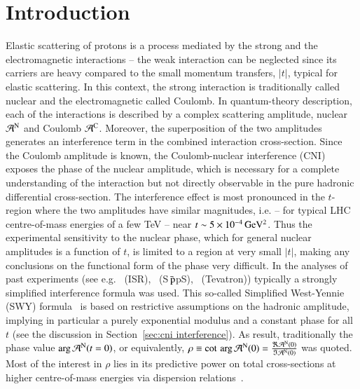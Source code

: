 \section{Introduction}
\label{sec:introduction}

Elastic scattering of protons is a process mediated by the strong and the electromagnetic interactions -- the weak interaction can be neglected since its carriers are heavy compared to the small momentum transfers, $|t|$, typical for elastic scattering. In this context, the strong interaction is traditionally called nuclear and the electromagnetic called Coulomb. In quantum-theory description, each of the interactions is described by a complex scattering amplitude, nuclear ${\cal A}^{\rm N}$ and Coulomb ${\cal A}^{\rm C}$. Moreover, the superposition 
of the two amplitudes generates an interference term in the combined interaction cross-section. 
Since the Coulomb amplitude is known, the Coulomb-nuclear interference (CNI) exposes the phase of the nuclear amplitude, which is necessary for a complete understanding of the interaction but not directly observable in the pure hadronic differential cross-section. The interference effect is most pronounced in the $t$-region where the two amplitudes have similar magnitudes, i.e. -- for typical LHC centre-of-mass energies of a few TeV -- near $t \sim 5 \times 10^{-4}\,\rm GeV^{2}$. Thus the experimental sensitivity to 
the nuclear phase, which for general nuclear amplitudes is a function of $t$, 
is limited to a region at very small $|t|$, making any conclusions on the 
functional form of the phase very difficult.
In the analyses of past experiments (see e.g.~\cite{plb43,plb66,npb141,prl47,plb115,plb120,plb128,npb262} 
(ISR),~\cite{plb198,plb316} (S$\bar{\,{\rm p}}$pS),~\cite{prl68} (Tevatron)) 
typically a strongly simplified interference formula was used. This so-called
Simplified West-Yennie (SWY) formula~\cite{wy68} is based on restrictive assumptions on the 
hadronic amplitude, implying in particular a purely exponential modulus and a 
constant phase for all $t$ (see the discussion in 
Section~\ref{sec:cni interference}).
As result, traditionally the phase value $\arg {\cal A}^{\rm N} (t=0)$, or
equivalently, $\rho \equiv \cot \, \arg {\cal A}^{\rm N} (0) = \frac{\Re {\cal A}^{\rm N} (0)}{\Im {\cal A}^{\rm N} (0)}$ was quoted. 
Most of the interest in $\rho$ lies in its predictive power on total cross-sections at higher centre-of-mass energies via dispersion 
relations~\cite{dremin-dispersion}. 

